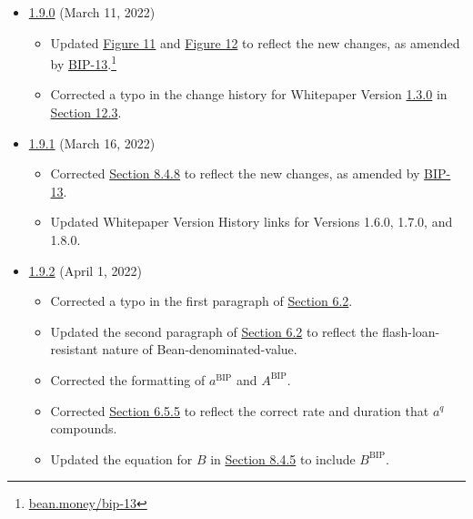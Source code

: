 \documentclass[class=article, crop=false]{standalone}
\begin{document}
\begin{itemize}[topsep=0pt, itemsep=3pt,leftmargin=16pt]
\begin{itemize}
    \end{itemize}
        \item \href{https://github.com/BeanstalkFarms/Beanstalk-Whitepaper/blob/master/version-history/beanstalk1_9_0.pdf}{1.9.0} (March 11, 2022)
    \begin{itemize}
        \item Updated \hyperref[fig 11]{Figure 11} and \hyperref[fig 12]{Figure 12} to reflect the new  changes, as amended by \href{https://bean.money/bip-13}{BIP-13}.\footnote{\href{https://bean.money/bip-13}{bean.money/bip-13}}
        \item Corrected a typo in the change history for Whitepaper Version \href{https://github.com/BeanstalkFarms/Beanstalk-Whitepaper/blob/master/version-history/beanstalk1_3_0.pdf}{1.3.0} in \hyperlink{subsection.12.3}{Section 12.3}.
    \end{itemize}
        \item \href{https://github.com/BeanstalkFarms/Beanstalk-Whitepaper/blob/master/version-history/beanstalk1_9_1.pdf}{1.9.1} (March 16, 2022)
    \begin{itemize}
        \item Corrected \hyperlink{subsubsection.8.4.8}{Section 8.4.8} to reflect the new  changes, as amended by \href{https://bean.money/bip-13}{BIP-13}.
        \item Updated Whitepaper Version History links for Versions 1.6.0, 1.7.0, and 1.8.0.
    \end{itemize}
        \item \href{https://github.com/BeanstalkFarms/Beanstalk-Whitepaper/blob/master/version-history/beanstalk1_9_2.pdf}{1.9.2} (April 1, 2022)
    \begin{itemize}
        \item Corrected a typo in the first paragraph of \hyperlink{subsection.6.2}{Section 6.2}.
        \item Updated the second paragraph of \hyperlink{subsection.6.2}{Section 6.2} to reflect the flash-loan-resistant nature of Bean-denominated-value.
        \item Corrected the formatting of $a^{\text{BIP}}$ and $A^{\text{BIP}}$.
        \item Corrected \hyperlink{subsubsection.6.5.5}{Section 6.5.5} to reflect the correct rate and duration that $a^q$ compounds.
        \item Updated the equation for $B$ in \hyperlink{subsubsection.8.4.5}{Section 8.4.5} to include $B^{\text{BIP}}$.

\end{itemize}
\end{itemize}
\end{document}
